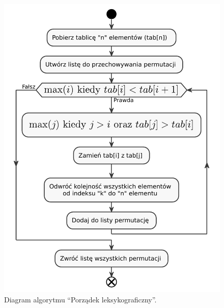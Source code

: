\begin{figure}[H]
	\centering
	\includegraphics[]{chapters/chapter4/gen_perm.pdf}
	\caption{Diagram algorytmu ``Porządek leksykograficzny''.}
	\label{gen_perm}
\end{figure}



